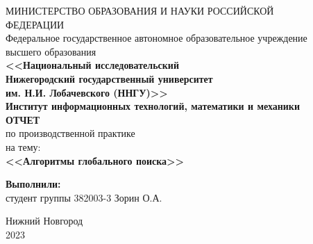 \begin{center} %
    МИНИСТЕРСТВО ОБРАЗОВАНИЯ И НАУКИ РОССИЙСКОЙ \\
    ФЕДЕРАЦИИ \\
    Федеральное государственное автономное образовательное учреждение  \\
    высшего образования\\ \textbf{<<Национальный исследовательский \\ Нижегородский государственный университет \\
    им. Н.И. Лобачевского (ННГУ)>>}\\[1.5cm]%
    \textbf{Институт информационных технологий, математики и механики}\\[5.5cm]
    
     \textbf{\large ОТЧЕТ} \\ %
     по производственной практике \\[0.6cm]
     
     на тему:\\
      \textbf{\large <<Алгоритмы глобального поиска>>}\\[6.5cm]
    \begin{flushright}
     \begin{minipage}{0.52\textwidth} %
     \begin{flushleft} %
      \textbf{Выполнили:} \\
     студент группы 382003-3 Зорин О.А. \\
     \end{flushleft} %
     \end{minipage} %
    \end{flushright}
     \vfill %
    
      Нижний Новгород \\
     2023
    
     \thispagestyle{empty} %
    
\end{center}